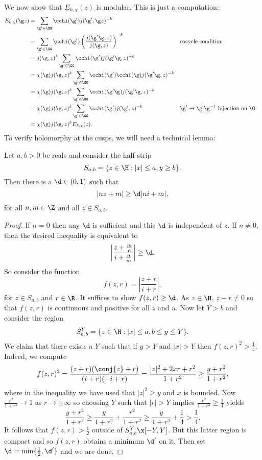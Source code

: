     We now show that $E_{k,\chi}(z)$ is modular. This is just a computation:
    \begin{align*}
      E_{k,\chi}(\g z) &= \sum_{\g' \in \GG}\cchi(\g')j(\g',\g z)^{-k} \\
      &= \sum_{\g' \in \GG}\cchi(\g')\left(\frac{j(\g'\g,z)}{j(\g,z)}\right)^{-k} && \text{cocycle condition} \\
      &= j(\g,z)^{k}\sum_{\g' \in \GG}\cchi(\g')j(\g'\g,z)^{-k} \\
      &= \chi(\g)j(\g,z)^{k}\sum_{\g' \in \GG}\cchi(\g')\cchi(\g)j(\g'\g,z)^{-k} \\
      &= \chi(\g)j(\g,z)^{k}\sum_{\g' \in \GG}\cchi(\g'\g)j(\g'\g,z)^{-k} \\
      &= \chi(\g)j(\g,z)^{k}\sum_{\g' \in \GG}\cchi(\g')j(\g',z)^{-k} && \text{$\g' \to \g'\g^{-1}$ bijection on $\G$} \\
      &= \chi(\g)j(\g,z)^{k}E_{k,\chi}(z).
    \end{align*}
    To verify holomorphy at the cusps, we will need a technical lemma:

    \begin{lemma}\label{lem:technical_Eisenstein_convergence_lemma}
      Let $a,b > 0$ be reals and consider the half-strip
      \[
        S_{a,b} = \{z \in \H:|x| \le a, y \ge b\}.
      \]
      Then there is a $\d \in (0,1)$ such that
      \[
        |nz+m| \ge \d|ni+m|,
      \]
      for all $n,m \in \Z$ and all $z \in S_{a,b}$.
    \end{lemma}
    \begin{proof}
      If $n = 0$ then any $\d$ is sufficient and this $\d$ is independent of $z$. If $n \neq 0$, then the desired inequality is equivalent to
      \[
        \left|\frac{z+\frac{m}{n}}{i+\frac{n}{m}}\right| \ge \d.
      \]
      So consider the function
      \[
        f(z,r) = \left|\frac{z+r}{i+r}\right|,
      \]
      for $z \in S_{a,b}$ and $r \in \R$. It suffices to show $f(z,r) \ge \d$. As $z \in \H$, $z-r \neq 0$ so that $f(z,r)$ is continuous and positive for all $z$ and $u$. Now let $Y > b$ and consider the region
      \[
        S_{a,b}^{Y} = \{z \in \H:|x| \le a, b \le y \le Y\}.
      \]
      We claim that there exists a $Y$ such that if $y > Y$ and $|x| > Y$ then $f(z,r)^{2} > \frac{1}{4}$. Indeed, we compute
      \[
        f(z,r)^{2} = \frac{(z+r)(\conj{z}+r)}{(i+r)(-i+r)} = \frac{|z|^{2}+2xr+r^{2}}{1+r^{2}} \ge \frac{y+r^{2}}{1+r^{2}},
      \]
      where in the inequality we have used that $|z|^{2} \ge y$ and $x$ is bounded. Now $\frac{r^{2}}{1+r^{2}} \to 1$ as $r \to \pm\infty$ so choosing $Y$ such that $|r| > Y$ implies $\frac{r^{2}}{1+r^{2}} \ge \frac{1}{4}$ yields
      \[
        \frac{y+r^{2}}{1+r^{2}} \ge \frac{y}{1+r^{2}}+\frac{r^{2}}{1+r^{2}} \ge \frac{y}{1+r^{2}}+\frac{1}{4} > \frac{1}{4}.
      \]
      It follows that $f(z,r) > \frac{1}{2}$ outside of $S_{a,b}^{Y} \x [-Y,Y]$. But this latter region is compact and so $f(z,r)$ obtains a minimum $\d'$ on it. Then set $\d = \min\{\frac{1}{2},\d'\}$ and we are done.
    \end{proof}

